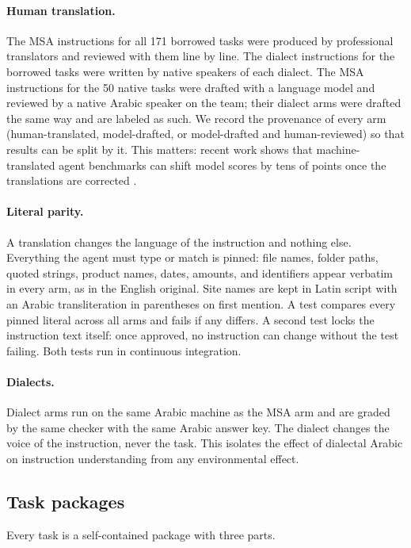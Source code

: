 \paragraph{Human translation.}
The MSA instructions for all 171 borrowed tasks were produced by professional
translators and reviewed with them line by line. The dialect instructions for
the borrowed tasks were written by native speakers of each dialect. The MSA
instructions for the 50 native tasks were drafted with a language model and
reviewed by a native Arabic speaker on the team; their dialect arms were
drafted the same way and are labeled as such. We record the provenance of
every arm (human-translated, model-drafted, or model-drafted and
human-reviewed) so that results can be split by it. This matters: recent work
shows that machine-translated agent benchmarks can shift model scores by tens
of points once the translations are corrected \citep{kim2026lilt}.

\paragraph{Literal parity.}
A translation changes the language of the instruction and nothing else.
Everything the agent must type or match is pinned: file names, folder paths,
quoted strings, product names, dates, amounts, and identifiers appear verbatim
in every arm, as in the English original. Site names are kept in Latin script
with an Arabic transliteration in parentheses on first mention. A test compares
every pinned literal across all arms and fails if any differs. A second test
locks the instruction text itself: once approved, no instruction can change
without the test failing. Both tests run in continuous integration.

\paragraph{Dialects.}
Dialect arms run on the same Arabic machine as the MSA arm and are graded by
the same checker with the same Arabic answer key. The dialect changes the
voice of the instruction, never the task. This isolates the effect of
dialectal Arabic on instruction understanding from any environmental effect.

\subsection{Task packages}
\label{sec:packages}

Every task is a self-contained package with three parts.

